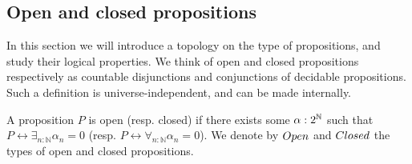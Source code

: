 %
\subsection{Open and closed propositions}
In this section we will introduce a topology on the type of propositions, and 
study their logical properties.
We think of open and closed propositions respectively as countable disjunctions and conjunctions of decidable propositions.
Such a definition is universe-independent, and can be made internally.

\begin{definition}
A proposition $P$ is open (resp. closed) if there exists some $\alpha:2^{\mathbb{N}}$ such that $P \leftrightarrow \exists_{n:\mathbb N} \alpha_n = 0$ (resp. $P \leftrightarrow \forall_{n:\mathbb N} \alpha_n = 0$). We denote by $\Open$ and $\Closed$ the types of open and closed propositions.
\end{definition}

